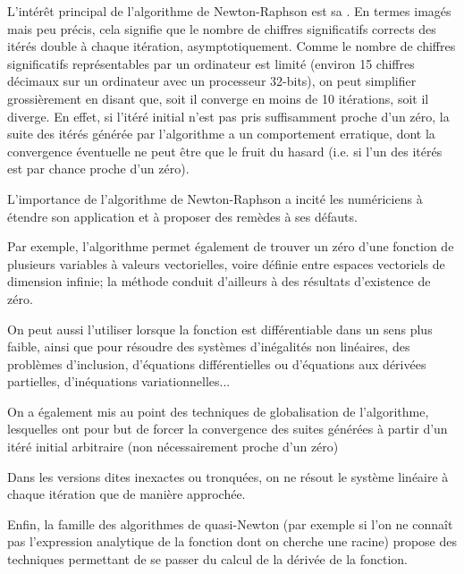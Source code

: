 \medskip
L'intérêt principal de l'algorithme de 
Newton-Raphson 
est sa . 
En termes imagés mais peu précis, cela signifie que le nombre de chiffres significatifs corrects des 
itérés double à chaque itération, asymptotiquement. 
Comme le nombre de chiffres significatifs représentables par un ordinateur est limité (environ 15 
chiffres décimaux sur un ordinateur avec un processeur 32-bits), on peut simplifier grossièrement 
en disant que, soit il converge en moins de 10 itérations, soit il diverge. 
En effet, si l'itéré initial n'est pas pris suffisamment proche d'un zéro, la suite des itérés 
générée par l'algorithme a un comportement erratique, dont la convergence éventuelle ne peut 
être que le fruit du hasard (i.e. si l'un des itérés est par chance proche d'un zéro).

\medskip
L'importance de l'algorithme de Newton-Raphson 
a incité les numériciens à étendre son application et à proposer 
des remèdes à ses défauts. 

Par exemple, l'algorithme permet également de trouver un zéro d'une fonction de plusieurs variables 
à valeurs vectorielles, voire définie entre espaces vectoriels de dimension infinie; 
la méthode conduit d'ailleurs à des résultats d'existence de zéro. 

On peut aussi l'utiliser lorsque la fonction est différentiable dans un sens plus faible, ainsi que pour 
résoudre des systèmes d'inégalités non linéaires, des problèmes d'inclusion, d'équations différentielles ou d'équations aux dérivées partielles,
d'inéquations variationnelles...

On a également mis au point des techniques de globalisation de l'algorithme, lesquelles ont pour but de 
forcer la convergence des suites générées à partir d'un itéré initial arbitraire (non nécessairement 
proche d'un zéro)

Dans les versions dites inexactes ou tronquées, on ne résout le système linéaire à chaque itération 
que de manière approchée. 

Enfin, la famille des algorithmes de quasi-Newton (par exemple si l'on ne connaît pas l'expression
analytique de la fonction dont on cherche une racine) propose des techniques permettant de se passer 
du calcul de la dérivée de la fonction. 

